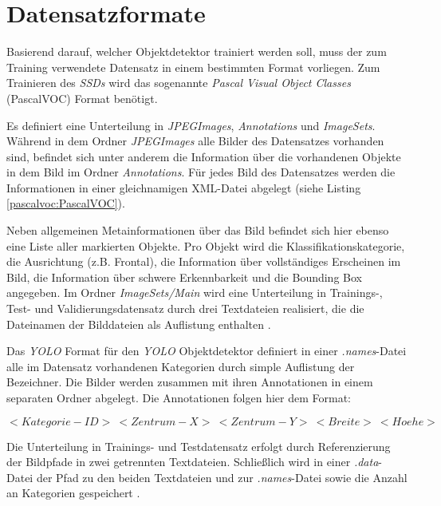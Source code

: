 \section{Datensatzformate} \label{format}

Basierend darauf, welcher Objektdetektor trainiert werden soll, muss der zum Training verwendete Datensatz in einem bestimmten Format vorliegen. Zum Trainieren des \textit{SSDs} wird das sogenannte \textit{Pascal Visual Object Classes} (PascalVOC) Format benötigt. 

Es definiert eine Unterteilung in \textit{JPEGImages}, \textit{Annotations} und \textit{ImageSets}. Während in dem Ordner \textit{JPEGImages} alle Bilder des Datensatzes vorhanden sind, befindet sich unter anderem die Information über die vorhandenen Objekte in dem Bild im Ordner \textit{Annotations}. Für jedes Bild des Datensatzes werden die Informationen in einer gleichnamigen XML-Datei abgelegt (siehe Listing \ref{pascalvoc:PascalVOC}).

\lstset{language=XML}


Neben allgemeinen Metainformationen über das Bild befindet sich hier ebenso eine Liste aller markierten Objekte. Pro Objekt wird die Klassifikationskategorie, die Ausrichtung (z.B. \glqq Frontal\grqq{}), die Information über vollständiges Erscheinen im Bild, die Information über schwere Erkennbarkeit und die Bounding Box angegeben. Im Ordner \textit{ImageSets/Main} wird eine Unterteilung in Trainings-, Test- und Validierungsdatensatz durch drei Textdateien realisiert, die die Dateinamen der Bilddateien als Auflistung enthalten \cite{MarkEveringhamS.M.AliEslamiLucVanGoolChristopherK.I.WilliamsJohnWinnAndrewZis.2014,MarkEveringham.20120521,MarkEveringham.20120521}. 

Das \textit{YOLO} Format für den \textit{YOLO} Objektdetektor definiert in einer \textit{.names}-Datei alle im Datensatz vorhandenen Kategorien durch simple Auflistung der Bezeichner. Die Bilder werden zusammen mit ihren Annotationen in einem separaten Ordner abgelegt. Die Annotationen folgen hier dem Format:

$<Kategorie-ID>\:<Zentrum-X>\:<Zentrum-Y>\:<Breite>\:<Hoehe>$

Die Unterteilung in Trainings- und Testdatensatz erfolgt durch Referenzierung der Bildpfade in zwei getrennten Textdateien. Schließlich wird in einer \textit{.data}-Datei der Pfad zu den beiden Textdateien und zur \textit{.names}-Datei sowie die Anzahl an Kategorien gespeichert \cite{ArunPonnusamy.20191006}.